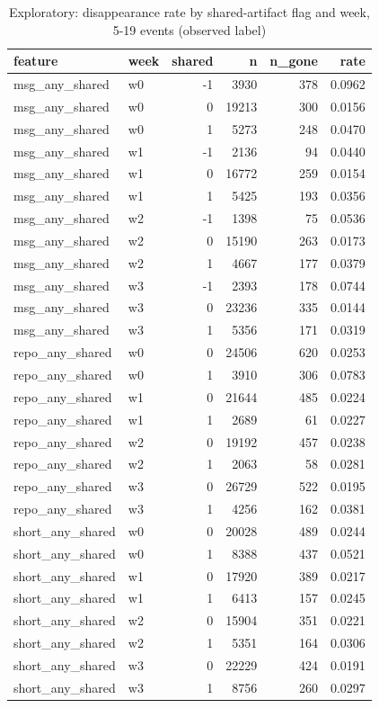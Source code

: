 \begin{table}
\caption{Exploratory: disappearance rate by shared-artifact flag and week, 5-19 events (observed label)}
\label{tab:tab_exploratory_shared_by_week}
\begin{tabular}{llrrrr}
\toprule
feature & week & shared & n & n\_gone & rate \\
\midrule
msg\_any\_shared & w0 & -1 & 3930 & 378 & 0.0962 \\
msg\_any\_shared & w0 & 0 & 19213 & 300 & 0.0156 \\
msg\_any\_shared & w0 & 1 & 5273 & 248 & 0.0470 \\
msg\_any\_shared & w1 & -1 & 2136 & 94 & 0.0440 \\
msg\_any\_shared & w1 & 0 & 16772 & 259 & 0.0154 \\
msg\_any\_shared & w1 & 1 & 5425 & 193 & 0.0356 \\
msg\_any\_shared & w2 & -1 & 1398 & 75 & 0.0536 \\
msg\_any\_shared & w2 & 0 & 15190 & 263 & 0.0173 \\
msg\_any\_shared & w2 & 1 & 4667 & 177 & 0.0379 \\
msg\_any\_shared & w3 & -1 & 2393 & 178 & 0.0744 \\
msg\_any\_shared & w3 & 0 & 23236 & 335 & 0.0144 \\
msg\_any\_shared & w3 & 1 & 5356 & 171 & 0.0319 \\
repo\_any\_shared & w0 & 0 & 24506 & 620 & 0.0253 \\
repo\_any\_shared & w0 & 1 & 3910 & 306 & 0.0783 \\
repo\_any\_shared & w1 & 0 & 21644 & 485 & 0.0224 \\
repo\_any\_shared & w1 & 1 & 2689 & 61 & 0.0227 \\
repo\_any\_shared & w2 & 0 & 19192 & 457 & 0.0238 \\
repo\_any\_shared & w2 & 1 & 2063 & 58 & 0.0281 \\
repo\_any\_shared & w3 & 0 & 26729 & 522 & 0.0195 \\
repo\_any\_shared & w3 & 1 & 4256 & 162 & 0.0381 \\
short\_any\_shared & w0 & 0 & 20028 & 489 & 0.0244 \\
short\_any\_shared & w0 & 1 & 8388 & 437 & 0.0521 \\
short\_any\_shared & w1 & 0 & 17920 & 389 & 0.0217 \\
short\_any\_shared & w1 & 1 & 6413 & 157 & 0.0245 \\
short\_any\_shared & w2 & 0 & 15904 & 351 & 0.0221 \\
short\_any\_shared & w2 & 1 & 5351 & 164 & 0.0306 \\
short\_any\_shared & w3 & 0 & 22229 & 424 & 0.0191 \\
short\_any\_shared & w3 & 1 & 8756 & 260 & 0.0297 \\
\bottomrule
\end{tabular}
\end{table}
